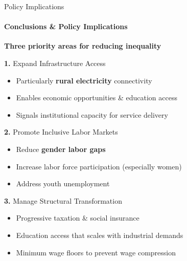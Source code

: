 \documentclass[aspectratio=169,8pt]{beamer}
\begin{document}
    \begin{frame}{Policy Implications}
        \framesubtitle{Conclusions \& Policy Implications}

        \begin{alertblock}{\textbf{Three priority areas for reducing inequality}}
            \vspace{-\baselineskip}
        \end{alertblock}

        \vspace{-0.1cm}
        \begin{exampleblock}{\textbf{1.} Expand Infrastructure Access}
            \begin{itemize}
                \item Particularly \textbf{rural electricity} connectivity
                \item Enables economic opportunities \& education access
                \item Signals institutional capacity for service delivery
            \end{itemize}
        \end{exampleblock}

        \vspace{-0.1cm}
        \begin{exampleblock}{\textbf{2.} Promote Inclusive Labor Markets}
            \begin{itemize}
                \item Reduce \textbf{gender labor gaps}
                \item Increase labor force participation (especially women)
                \item Address youth unemployment
            \end{itemize}
        \end{exampleblock}

        \vspace{-0.1cm}
        \begin{exampleblock}{\textbf{3.} Manage Structural Transformation}
            \begin{itemize}
                \item Progressive taxation \& social insurance
                \item Education access that scales with industrial demands
                \item Minimum wage floors to prevent wage compression
            \end{itemize}
        \end{exampleblock}
    \end{frame}
\end{document}
